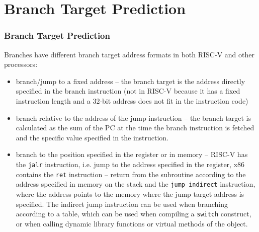 \documentclass{beamer}
\begin{document}
\section{Branch Target Prediction}

\begin{frame}[shrink=1]
\frametitle{Branch Target Prediction}

Branches have different branch target address formats in both RISC-V and other processors:
\begin{itemize}
\item branch/jump to a fixed address -- the branch target is the address directly specified in the branch instruction (not in RISC-V because it has a fixed instruction length and a 32-bit address does not fit in the instruction code)
\item branch relative to the address of the jump instruction -- the branch target is calculated as the sum of the PC at the time the branch instruction is fetched and the specific value specified in the instruction.
\item branch to the position specified in the register or in memory -- RISC-V has the \texttt{jalr} instruction, i.e. jump to the address specified in the register, x86 contains the \texttt{ret} instruction -- return from the subroutine according to the address specified in memory on the stack and the \texttt{jump indirect} instruction, where the address points to the memory where the jump target address is specified. The indirect jump instruction can be used when branching according to a table, which can be used when compiling a \texttt{switch} construct, or when calling dynamic library functions or virtual methods of the object.
\end{itemize}
\end{frame}
\end{document}
